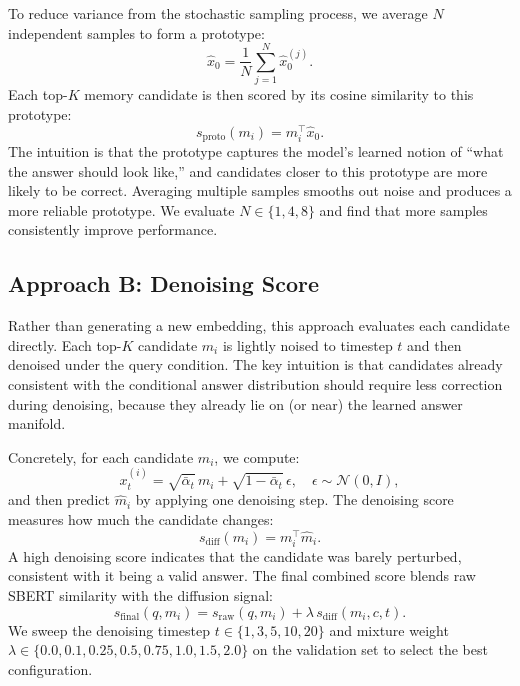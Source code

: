 \documentclass{article}
\begin{document}
To reduce variance from the stochastic sampling process, we average $N$ independent samples to form a prototype:
\begin{equation}
  \hat{x}_0 = \frac{1}{N}\sum_{j=1}^{N} \hat{x}_0^{(j)}.
\end{equation}
Each top-$K$ memory candidate is then scored by its cosine similarity to this prototype:
\begin{equation}
  s_{\mathrm{proto}}(m_i) = m_i^\top \hat{x}_0.
\end{equation}
The intuition is that the prototype captures the model's learned notion of ``what the answer should look like,'' and candidates closer to this prototype are more likely to be correct. Averaging multiple samples smooths out noise and produces a more reliable prototype. We evaluate $N \in \{1, 4, 8\}$ and find that more samples consistently improve performance.

\subsection{Approach B: Denoising Score}

Rather than generating a new embedding, this approach evaluates each candidate directly. Each top-$K$ candidate $m_i$ is lightly noised to timestep $t$ and then denoised under the query condition. The key intuition is that candidates already consistent with the conditional answer distribution should require less correction during denoising, because they already lie on (or near) the learned answer manifold.

Concretely, for each candidate $m_i$, we compute:
\begin{equation}
  x_t^{(i)} = \sqrt{\bar{\alpha}_t}\, m_i + \sqrt{1-\bar{\alpha}_t}\, \epsilon, \quad \epsilon \sim \mathcal{N}(0,I),
\end{equation}
and then predict $\hat{m}_i$ by applying one denoising step. The denoising score measures how much the candidate changes:
\begin{equation}
  s_{\mathrm{diff}}(m_i) = m_i^\top \hat{m}_i.
\end{equation}
A high denoising score indicates that the candidate was barely perturbed, consistent with it being a valid answer. The final combined score blends raw SBERT similarity with the diffusion signal:
\begin{equation}
  s_{\mathrm{final}}(q,m_i) =
  s_{\mathrm{raw}}(q,m_i) + \lambda\, s_{\mathrm{diff}}(m_i,c,t).
\end{equation}
We sweep the denoising timestep $t \in \{1, 3, 5, 10, 20\}$ and mixture weight $\lambda \in \{0.0, 0.1, 0.25, 0.5, 0.75, 1.0, 1.5, 2.0\}$ on the validation set to select the best configuration.
\end{document}

